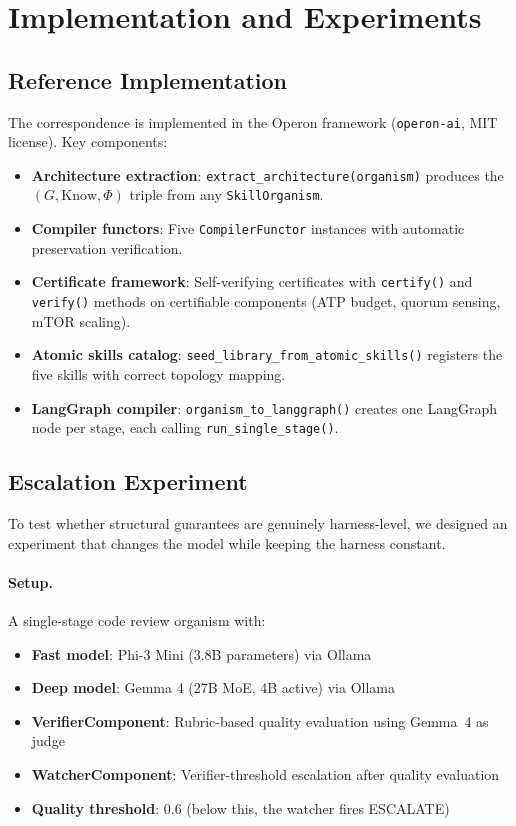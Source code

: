 \section{Implementation and Experiments}\label{sec:experiments}

\subsection{Reference Implementation}

The correspondence is implemented in the Operon framework (\texttt{operon-ai}, MIT license). Key components:

\begin{itemize}[leftmargin=*]
\item \textbf{Architecture extraction}: \texttt{extract\_architecture(organism)} produces the $(G, \mathrm{Know}, \Phi)$ triple from any \texttt{SkillOrganism}.
\item \textbf{Compiler functors}: Five \texttt{CompilerFunctor} instances with automatic preservation verification.
\item \textbf{Certificate framework}: Self-verifying certificates with \texttt{certify()} and \texttt{verify()} methods on certifiable components (ATP budget, quorum sensing, mTOR scaling).
\item \textbf{Atomic skills catalog}: \texttt{seed\_library\_from\_atomic\_skills()} registers the five skills with correct topology mapping.
\item \textbf{LangGraph compiler}: \texttt{organism\_to\_langgraph()} creates one LangGraph node per stage, each calling \texttt{run\_single\_stage()}.
\end{itemize}

\subsection{Escalation Experiment}

To test whether structural guarantees are genuinely harness-level, we designed an experiment that changes the model while keeping the harness constant.

\paragraph{Setup.} A single-stage code review organism with:
\begin{itemize}[leftmargin=*]
\item \textbf{Fast model}: Phi-3 Mini (3.8B parameters) via Ollama
\item \textbf{Deep model}: Gemma 4 (27B MoE, 4B active) via Ollama
\item \textbf{VerifierComponent}: Rubric-based quality evaluation using Gemma~4 as judge
\item \textbf{WatcherComponent}: Verifier-threshold escalation after quality evaluation
\item \textbf{Quality threshold}: 0.6 (below this, the watcher fires ESCALATE)
\end{itemize}

